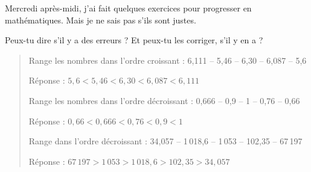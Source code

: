 \begin{cursive}
  Mercredi après-midi, j'ai fait quelques exercices pour progresser en
  mathématiques. Mais je ne sais pas s'ils sont justes.\par Peux-tu
  dire s'il y a des erreurs ? Et peux-tu les corriger, s'il y en a ?
\end{cursive}
\begin{quote}
  \begin{myenumerate}
    \item Range les nombres dans l'ordre croissant : 6,111 -- 5,46 -- 6,30 -- 6,087 -- 5,6
      \par\begin{cursive}
        Réponse : $5,6<5,46<6,30<6,087<6,111$
      \end{cursive}
    \item Range les nombres dans l'ordre décroissant : 0,666 -- 0,9 -- 1 -- 0,76 -- 0,66
      \par\begin{cursive}
        Réponse : $0,66<0,666<0,76<0,9<1$
      \end{cursive}
    \item Range dans l'ordre décroissant : 34,057 -- 1\,018,6 -- 1\,053 -- 102,35 -- 67\,197
      \par\begin{cursive}
        Réponse : $67\,197>1\,053>1\,018,6>102,35>34,057$
      \end{cursive}
  \end{myenumerate}
\end{quote}